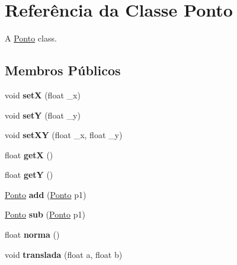 \hypertarget{classPonto}{}\section{Referência da Classe Ponto}
\label{classPonto}


A \mbox{\hyperlink{classPonto}{Ponto}} class.  


\subsection*{Membros Públicos}
\begin{DoxyCompactItemize}
\item 
\mbox{\label{classPonto_a22129ad4dbf8019c479021d70a9f6774}} 
void {\bfseries setX} (float \+\_\+x)
\item 
\mbox{\label{classPonto_a2d9e5b9fade9d3f3f21122a2dc2f5e11}} 
void {\bfseries setY} (float \+\_\+y)
\item 
\mbox{\label{classPonto_a827488219a7da184d440f687cec49ce6}} 
void {\bfseries set\+XY} (float \+\_\+x, float \+\_\+y)
\item 
\mbox{\label{classPonto_ae4823d6ee26ff3448ee403d26a3c6d2f}} 
float {\bfseries getX} ()
\item 
\mbox{\label{classPonto_ab120600953e6544301223b9b05a43ee5}} 
float {\bfseries getY} ()
\item 
\mbox{\label{classPonto_abb68d6122278de262e8ed1c70714e3d9}} 
\mbox{\hyperlink{classPonto}{Ponto}} {\bfseries add} (\mbox{\hyperlink{classPonto}{Ponto}} p1)
\item 
\mbox{\label{classPonto_a8404fcad0fca2ce768ab9e1550f5d3a0}} 
\mbox{\hyperlink{classPonto}{Ponto}} {\bfseries sub} (\mbox{\hyperlink{classPonto}{Ponto}} p1)
\item 
\mbox{\label{classPonto_a9b0ddbdddd05edbc4d45ef0671a628c6}} 
float {\bfseries norma} ()
\item 
\mbox{\label{classPonto_a96a4395204ec010814e67d20705e630f}} 
void {\bfseries translada} (float a, float b)
\item 

\end{DoxyCompactItemize}
